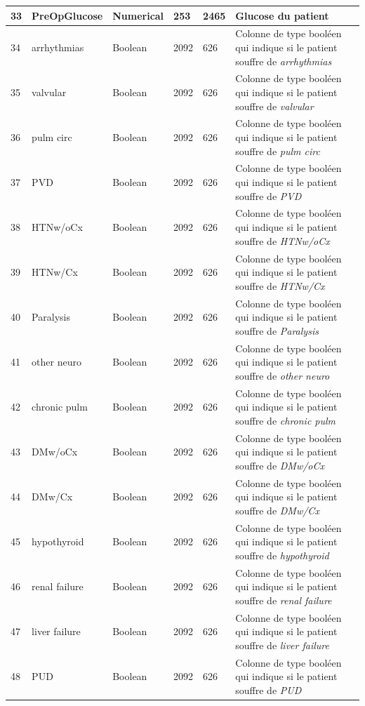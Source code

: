 \documentclass[12pt, french]{report}
\begin{document}
\begin{longtable}{| p{} | p{} | p{} | p{}  | p{} | p{} |  }
33 &	PreOpGlucose & Numerical & 253 & 2465 & Glucose du patient \\ \hline 
34 &	arrhythmias & Boolean & 2092 & 626& Colonne de type booléen qui indique si le patient souffre  de \textit{arrhythmias} \\ \hline 
35 &	valvular & Boolean & 2092 & 626& Colonne de type booléen qui indique si le patient souffre  de \textit{valvular} \\ \hline 
36 &	pulm circ & Boolean & 2092 & 626& Colonne de type booléen qui indique si le patient souffre  de \textit{pulm circ} \\ \hline 
37 &	PVD & Boolean & 2092 & 626& Colonne de type booléen qui indique si le patient souffre  de \textit{PVD} \\ \hline 
38 &	HTNw/oCx & Boolean & 2092 & 626& Colonne de type booléen qui indique si le patient souffre  de \textit{HTNw/oCx} \\ \hline 
39 &	HTNw/Cx & Boolean & 2092 & 626& Colonne de type booléen qui indique si le patient souffre  de \textit{HTNw/Cx} \\ \hline 
40 &	Paralysis & Boolean & 2092 & 626& Colonne de type booléen qui indique si le patient souffre  de \textit{Paralysis} \\ \hline 
41 &	other neuro & Boolean & 2092 & 626& Colonne de type booléen qui indique si le patient souffre  de \textit{other neuro} \\ \hline 
42 &	chronic pulm & Boolean & 2092 & 626& Colonne de type booléen qui indique si le patient souffre  de \textit{chronic pulm} \\ \hline 
43 &	DMw/oCx & Boolean & 2092 & 626& Colonne de type booléen qui indique si le patient souffre  de \textit{DMw/oCx} \\ \hline 
44 &	DMw/Cx & Boolean & 2092 & 626& Colonne de type booléen qui indique si le patient souffre  de \textit{DMw/Cx} \\ \hline 
45 &	hypothyroid & Boolean & 2092 & 626& Colonne de type booléen qui indique si le patient souffre  de \textit{hypothyroid} \\ \hline 
46 &	renal failure & Boolean & 2092 & 626& Colonne de type booléen qui indique si le patient souffre  de \textit{renal failure} \\ \hline 
47 &	liver failure & Boolean & 2092 & 626& Colonne de type booléen qui indique si le patient souffre  de \textit{liver failure} \\ \hline 
48 &	PUD & Boolean & 2092 & 626& Colonne de type booléen qui indique si le patient souffre  de \textit{PUD} \\ \hline 

\end{longtable}
\end{document}
